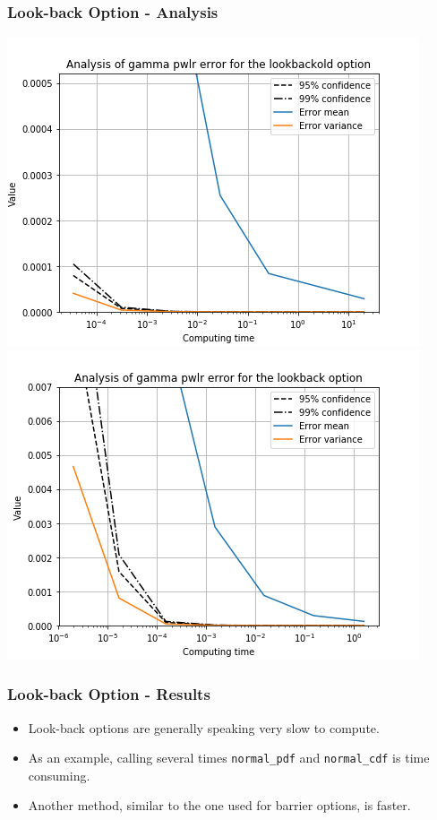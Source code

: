 \documentclass[12pt]{beamer}
\begin{document}
\begin{frame}
\frametitle{Look-back Option - Analysis}
\includegraphics[width=.5\textwidth]{graphs/lookbackoldgammapwlrtime.png}
\includegraphics[width= .5\textwidth]{graphs/lookbackgammapwlrtime.png}
\end{frame}

\begin{frame}
\frametitle{Look-back Option - Results}
\begin{itemize}
  \item Look-back options are generally speaking very slow to compute.
  \item As an example, calling several times \texttt{normal\_pdf} and \texttt{normal\_cdf} is time consuming.
  \item Another method, similar to the one used for barrier options, is faster.
\end{itemize}
\end{frame}
\end{document}
